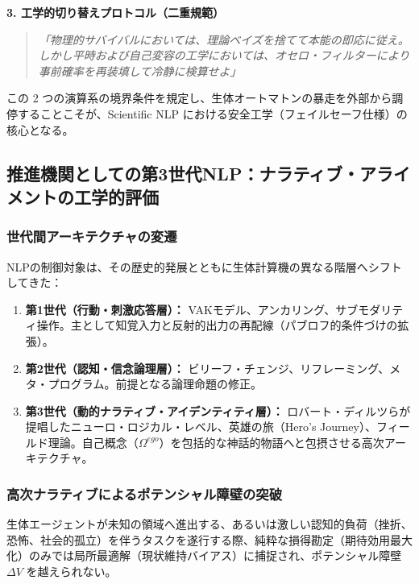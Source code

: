 \begin{tcolorbox}[colback=gray!5,colframe=black!75,title=設計ノート：なぜ推論機は事前確率を切り捨てるのか]
\textbf{3. 工学的切り替えプロトコル（二重規範）}
\begin{quote}
\textit{「物理的サバイバルにおいては、理論ベイズを捨てて本能の即応に従え。\\
しかし平時および自己変容の工学においては、オセロ・フィルターにより事前確率を再装填して冷静に検算せよ」}
\end{quote}
この 2 つの演算系の境界条件を規定し、生体オートマトンの暴走を外部から調停することこそが、Scientific NLP における安全工学（フェイルセーフ仕様）の核心となる。
\end{tcolorbox}


\subsection{推進機関としての第3世代NLP：ナラティブ・アライメントの工学的評価}
\label{sec:third_gen_nlp_ego_drive}

\subsubsection{世代間アーキテクチャの変遷}
NLPの制御対象は、その歴史的発展とともに生体計算機の異なる階層へシフトしてきた：
\begin{enumerate}
    \item \textbf{第1世代（行動・刺激応答層）：} VAKモデル、アンカリング、サブモダリティ操作。主として知覚入力と反射的出力の再配線（パブロフ的条件づけの拡張）。
    \item \textbf{第2世代（認知・信念論理層）：} ビリーフ・チェンジ、リフレーミング、メタ・プログラム。前提となる論理命題の修正。
    \item \textbf{第3世代（動的ナラティブ・アイデンティティ層）：} ロバート・ディルツらが提唱したニューロ・ロジカル・レベル、英雄の旅（Hero's Journey）、フィールド理論。自己概念（$\Omega^{ego}$）を包括的な神話的物語へと包摂させる高次アーキテクチャ。
\end{enumerate}

\subsubsection{高次ナラティブによるポテンシャル障壁の突破}
生体エージェントが未知の領域へ進出する、あるいは激しい認知的負荷（挫折、恐怖、社会的孤立）を伴うタスクを遂行する際、純粋な損得勘定（期待効用最大化）のみでは局所最適解（現状維持バイアス）に捕捉され、ポテンシャル障壁 $\Delta V$ を越えられない。

